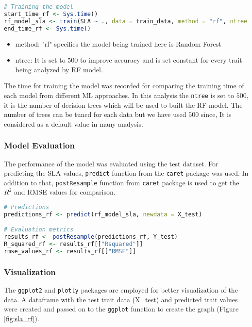 \documentclass[12pt,a4paper]{report}
\begin{document}
\begin{lstlisting}[language=R, style=mystyle]
# Training the model
start_time_rf <- Sys.time()
rf_model_sla <- train(SLA ~ ., data = train_data, method = "rf", ntree = 500)
end_time_rf <- Sys.time()
\end{lstlisting}

\begin{itemize}
    \item method: "rf" specifies the model being trained here is Random Forest
    \item ntree: It is set to $500$ to improve accuracy and is set constant for every trait being analyzed by RF model.
\end{itemize}

The time for training the model was recorded for comparing the training time of each model from different ML approaches. In this analysis the \texttt{ntree} is set to $500$, it is the number of decision trees which will be used to built the RF model. The number of trees can be tuned for each data but we have used $500$ since, It is considered as a default value in many analysis. \\

\subsubsection*{Model Evaluation}
The performance of the model was evaluated using the test dataset. For predicting the SLA values, \texttt{predict} function from the \texttt{caret} package was used. In addition to that, \texttt{postResample} function from \texttt{caret} package is used to get the $R^2$ and RMSE values for comparison.\\

\begin{lstlisting}[language=R, style=mystyle]
# Predictions
predictions_rf <- predict(rf_model_sla, newdata = X_test)

# Evaluation metrics
results_rf <- postResample(predictions_rf, Y_test)
R_squared_rf <- results_rf[["Rsquared"]]
rmse_values_rf <- results_rf[["RMSE"]]
\end{lstlisting}

\subsubsection*{Visualization}
The \texttt{ggplot2} and \texttt{plotly} packages are employed for better visualization of the data. A dataframe with the test trait data (X\_test) and predicted trait values were created and passed on to the \texttt{ggplot} function to create the graph (Figure \ref{fig:sla_rf}).\\
\end{document}
